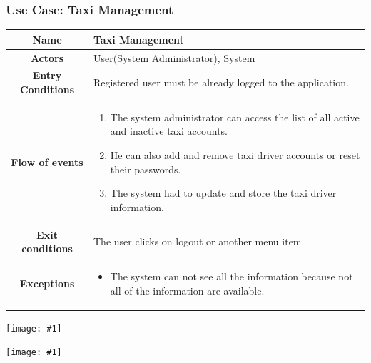 \documentclass[11pt, a4paper,titlepage]{article}
\newcommand{\image}[1]{
	\begin{center}
		\noindent \texttt{[image: \#1]}
	\end{center}
	}
\begin{document}
\subsubsection{Use Case: Taxi Management}
		\begin{tabularx}{\textwidth}{| c | X |}
			\hline
			\textbf{Name} & 
			Taxi Management
			\\
			\hline
			\textbf{Actors} & 
			User(System Administrator), System  
			\\
			\hline
			\textbf{Entry Conditions} &
			Registered user must be already logged to the application. 
			\\
			\hline
			\textbf{Flow of events} & 
			\begin{enumerate}
				\item The system administrator can access the list of all active and inactive taxi accounts. 
				\item He can also add and remove taxi driver accounts or reset their passwords.
				\item The system had to update and store the taxi driver information.
			\end{enumerate}						
			\\
			\hline
			\textbf{Exit conditions} & 
			The user clicks on logout or another menu item
			\\
			\hline
			\textbf{Exceptions} & 
			\begin{itemize}
				\item The system can not see all the information because not all of the information are available.
			\end{itemize} 
			\\
			\hline		
		\end{tabularx}
		\image{usecase_taxi_management.png}
		\image{diagram_sequence_taxi_management.png}
		\newpage
\end{document}
